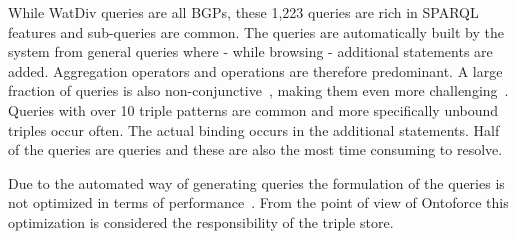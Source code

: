 While WatDiv queries are all BGPs, these 1,223 queries are rich in SPARQL features and sub-queries are common.
The queries are automatically built by the system from general queries where - while browsing - additional  statements are added. 
Aggregation operators and  operations are therefore predominant. A large fraction of queries is also non-conjunctive~\cite{conjunctive}, making them even more challenging~\cite{Picalausa2011}.
Queries with over 10 triple patterns are common and more specifically unbound triples occur often. The actual binding occurs in the additional  statements. Half of the queries are  queries and these are also the most time consuming to resolve. 

Due to the automated way of generating queries the formulation of the queries is not optimized in terms of performance~\cite{Groth}. From the point of view of Ontoforce this optimization is considered the responsibility of the triple store.

